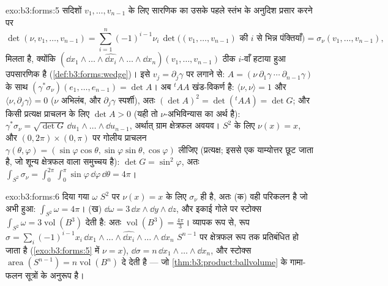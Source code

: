 \begin{solution}{exo:b3:forms:5}
सदिशों $v_1, \dots, v_{n-1}$ के लिए सारणिक का उसके पहले
स्तंभ के अनुदिश प्रसार करने पर
\[
\det(\nu, v_1, \dots, v_{n-1}) =
\sum_{i=1}^n(-1)^{i-1}\nu_i\,
\det\bigl((v_1, \dots, v_{n-1}) \text{ की } i
\text{ से भिन्न पंक्तियाँ}\bigr)
= \sigma_\nu(v_1, \dots, v_{n-1}),
\]
मिलता है, क्योंकि $(\dd x_1\wedge\dots\wedge\widehat{\dd
x_i}\wedge\dots\wedge\dd x_n)(v_1, \dots, v_{n-1})$ ठीक
$i$-वाँ हटाया हुआ उपसारणिक है
(\cref{def:b3:forms:wedge})। इसे $v_j =
\partial_j\gamma$ पर लगाने से: $A = (\nu\ \partial_1\gamma\ \cdots\
\partial_{n-1}\gamma)$ के साथ $(\gamma^*\sigma_\nu)(e_1, \dots,
e_{n-1}) = \det A$। अब ${}^t\!AA$ खंड-विकर्ण है:
$\langle\nu, \nu\rangle = 1$ और $\langle\nu,
\partial_j\gamma\rangle = 0$ ($\nu$ अभिलंब, और
$\partial_j\gamma$ स्पर्शी), अतः $(\det A)^2 =
\det({}^t\!AA) = \det G$; और किसी प्रत्यक्ष प्राचलन के लिए
$\det A > 0$ (यही तो $\nu$-अभिविन्यास का अर्थ है):
$\gamma^*\sigma_\nu = \sqrt{\det G}\,\dd
u_1\wedge\dots\wedge\dd u_{n-1}$, अर्थात् ग्राम क्षेत्रफल
अवयव। $S^2$ के लिए $\nu(x) = x$, और
$(0,2\pi)\times(0,\pi)$ पर गोलीय प्राचलन
$\gamma(\theta, \varphi) = (\sin\varphi\cos\theta,
\sin\varphi\sin\theta, \cos\varphi)$ लीजिए (प्रत्यक्ष; इससे
एक याम्योत्तर छूट जाता है, जो शून्य क्षेत्रफल वाला समुच्चय
है): $\det G = \sin^2\varphi$, अतः $\int_{S^2}\sigma_\nu =
\int_0^{2\pi}\!\!\int_0^\pi\sin\varphi\,\dd\varphi\,
\dd\theta = 4\pi$।
\end{solution}

\begin{solution}{exo:b3:forms:6}
दिया गया $\omega$ $S^2$ पर $\nu(x) = x$ के लिए $\sigma_\nu$
ही है, अतः (क) वही परिकलन है जो अभी हुआ:
$\int_{S^2}\omega = 4\pi$। (ख) $\dd\omega = 3\,\dd
x\wedge\dd y\wedge\dd z$, और इकाई गोले पर स्टोक्स
$\int_{S^2}\omega = 3\operatorname{vol}(B^3)$ देती है: अतः
$\operatorname{vol}(B^3) = \frac{4\pi}3$। व्यापक रूप से, रूप
$\sigma = \sum_i(-1)^{i-1}x_i\,\dd
x_1\wedge\dots\wedge\widehat{\dd x_i}\wedge\dots\wedge\dd
x_n$ $S^{n-1}$ पर क्षेत्रफल रूप तक प्रतिबंधित हो जाता है
(\cref{exo:b3:forms:5} में $\nu = x$), $\dd\sigma = n\,\dd
x_1\wedge\dots\wedge\dd x_n$, और स्टोक्स
$\operatorname{area}(S^{n-1}) = n\operatorname{vol}(B^n)$
दे देती है --- जो \cref{thm:b3:product:ballvolume} के
गामा-फलन सूत्रों के अनुरूप है।
\end{solution}

